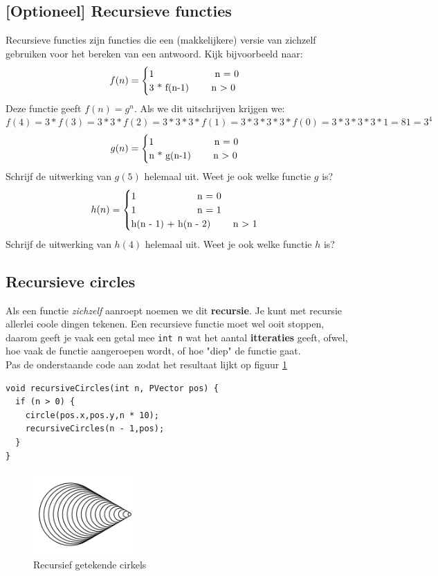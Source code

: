 \documentclass{../qh_exercise}
\begin{document}
\subsection{[Optioneel] Recursieve functies}
Recursieve functies zijn functies die een (makkelijkere) versie van zichzelf gebruiken voor het bereken van een antwoord. Kijk bijvoorbeeld naar:
\[f(n) = \begin{cases}
        $1 \qquad\qquad\qquad n = 0$\\
        $3 * f(n-1)  \qquad n $>$ 0$
    \end{cases}
   \]
Deze functie geeft $f(n) = g^n$. Als we dit uitschrijven krijgen we: $f(4) = 3 * f(3) = 3 * 3 * f(2) = 3 * 3 * 3 * f(1) = 3 * 3 * 3 * 3 * f(0) = 3 * 3 * 3 * 3 * 1 = 81 = 3^4$
\[g(n) = \begin{cases}
        $1 \qquad\qquad\qquad n = 0$\\
        $n * g(n-1)  \qquad n $>$ 0$
    \end{cases}
   \]
Schrijf de uitwerking van $g(5)$ helemaal uit. Weet je ook welke functie $g$ is?
\[h(n) = \begin{cases}
        $1 \qquad\qquad\qquad n = 0$\\
        $1 \qquad\qquad\qquad n = 1$\\
        $h(n - 1) + h(n - 2)  \qquad n $>$ 1$
    \end{cases}
   \]
Schrijf de uitwerking van $h(4)$ helemaal uit. Weet je ook welke functie $h$ is?

\subsection{Recursieve circles}
Als een functie \textit{zichzelf} aanroept noemen we dit \textbf{recursie}. 
Je kunt met recursie allerlei coole dingen tekenen. Een recursieve functie moet wel ooit stoppen, daarom geeft je vaak een getal mee \texttt{int n} wat het aantal \textbf{itteraties} geeft, ofwel, hoe vaak de functie aangeroepen wordt, of hoe "diep" de functie gaat.\\
Pas de onderstaande code aan zodat het resultaat lijkt op figuur \ref{fig:recursive_circles}
\begin{lstlisting}
void recursiveCircles(int n, PVector pos) {
  if (n > 0) { 
    circle(pos.x,pos.y,n * 10);
    recursiveCircles(n - 1,pos);
  }
}
\end{lstlisting}
\begin{figure}[H]
	\centering
	\includegraphics[width=4cm]{recursive_circles.png}
	\caption{Recursief getekende cirkels}
	\label{fig:recursive_circles}
\end{figure}
\end{document}

